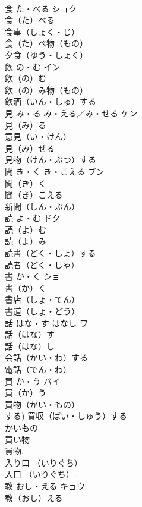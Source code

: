 \documentclass[8pt]{extreport}
\begin{document}
\begin{CJK}{UTF8}{min}
\\	食	た・べる	ショク	
\\	食（た）べる　
\\	食事（しょく・じ）　
\\	食（た）べ物（もの）　
\\	夕食（ゆう・しょく）　
\\	飲	の・む	イン	
\\	飲（の）む　
\\	飲（の）み物（もの）　
\\	飲酒（いん・しゅ）する　
\\	見	み・る み・える／み・せる	ケン	
\\	見（み）る　
\\	意見（い・けん）　
\\	見（み）せる　
\\	見物（けん・ぶつ）する　
\\	聞	き・く き・こえる	ブン	
\\	聞（き）く　
\\	聞（き）こえる　
\\	新聞（しん・ぶん）　
\\	読	よ・む	ドク	
\\	読（よ）む　
\\	読（よ）み　
\\	読書（どく・しょ）する　
\\	読者（どく・しゃ）　
\\	書	か・く	ショ	
\\	書（か）く　
\\	書店（しょ・てん）　
\\	書道（しょ・どう）　
\\	話	はな・す はなし	ワ	
\\	話（はな）す　
\\	話（はな）し　
\\	会話（かい・わ）する　
\\	電話（でん・わ）　
\\	買	か・う	バイ	
\\	買（か）う　
\\	買物（かい・もの）　
\\	する) 買収（ばい・しゅう）する　
\\	かいもの 
\\	買い物 
\\	買物. 
\\	入り口 （いりぐち）　
\\	入口 （いりぐち）.	
\\	教	おし・える	キョウ	
\\	教（おし）える　

\end{CJK}
\end{document}

